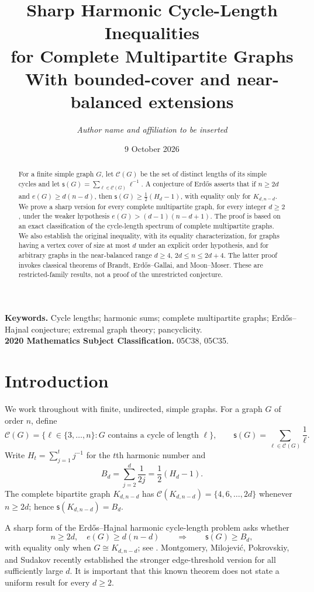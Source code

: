 \documentclass[11pt,letterpaper]{article}
\title{\bfseries Sharp Harmonic Cycle-Length Inequalities\\for Complete Multipartite Graphs\\[5pt]
\large With bounded-cover and near-balanced extensions}
\author{\textit{Author name and affiliation to be inserted}}
\date{9 October 2026}
\newcommand{\cset}{\mathcal{C}}
\newcommand{\hc}{\mathsf{s}}
\newcommand{\edges}{e}
\begin{document}
\maketitle
\begin{abstract}
For a finite simple graph $G$, let $\cset(G)$ be the set of distinct lengths of its simple cycles and let
$\hc(G)=\sum_{\ell\in\cset(G)}\ell^{-1}$.  A conjecture of Erd\H{o}s asserts that if $n\ge 2d$ and
$\edges(G)\ge d(n-d)$, then $\hc(G)\ge \frac12(H_d-1)$, with equality only for $K_{d,n-d}$.
We prove a sharp version for every complete multipartite graph, for every integer $d\ge 2$,
under the weaker hypothesis $\edges(G)>(d-1)(n-d+1)$.  The proof is based on an exact
classification of the cycle-length spectrum of complete multipartite graphs.
We also establish the original inequality, with its equality characterization, for graphs
having a vertex cover of size at most $d$ under an explicit order hypothesis, and for
arbitrary graphs in the near-balanced range $d\ge4$, $2d\le n\le2d+4$.
The latter proof invokes classical theorems of Brandt, Erd\H{o}s--Gallai, and Moon--Moser.
These are restricted-family results, not a proof of the unrestricted conjecture.
\end{abstract}
\noindent\textbf{Keywords.} Cycle lengths; harmonic sums; complete multipartite graphs;
Erd\H{o}s--Hajnal conjecture; extremal graph theory; pancyclicity.\\
\noindent\textbf{2020 Mathematics Subject Classification.} 05C38, 05C35.

\section{Introduction}
We work throughout with finite, undirected, simple graphs.  For a graph $G$ of order $n$, define
\[
\cset(G)=\{\ell\in\{3,\dots,n\}:G\text{ contains a cycle of length }\ell\},
\qquad \hc(G)=\sum_{\ell\in\cset(G)}\frac1\ell.
\]
Write $H_t=\sum_{j=1}^{t}j^{-1}$ for the $t$th harmonic number and
\[
B_d=\sum_{j=2}^{d}\frac1{2j}=\frac12(H_d-1).
\]
The complete bipartite graph $K_{d,n-d}$ has
$\cset(K_{d,n-d})=\{4,6,\ldots,2d\}$ whenever $n\ge 2d$; hence
$\hc(K_{d,n-d})=B_d$.

A sharp form of the Erd\H{o}s--Hajnal harmonic cycle-length problem asks whether
\begin{equation}\label{eq:erdos}
 n\ge 2d,\quad \edges(G)\ge d(n-d)
 \qquad\Longrightarrow\qquad
 \hc(G)\ge B_d,
\end{equation}
with equality only when $G\cong K_{d,n-d}$; see \cite{MMPS,EP}.
Montgomery, Milojevi\'c, Pokrovskiy, and Sudakov \cite{MMPS} recently established the
stronger edge-threshold version for all sufficiently large $d$.  It is important that this
known theorem does not state a uniform result for every $d\ge2$.
\end{document}
